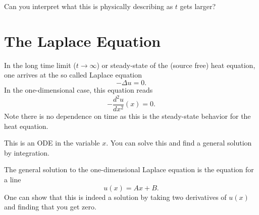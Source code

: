        \begin{exercise}
        Can you interpret what this is physically describing as $t$ gets larger?
        \end{exercise}
        
    
        \section{The Laplace Equation}
        In the long time limit ($t\to \infty$) or steady-state of the (source free) heat equation, one arrives at the so called Laplace equation
        \[
        -\Delta u = 0.
        \]
        In the one-dimensional case, this equation reads
        \[
        -\frac{d^2 u}{dx^2}(x) = 0.
        \]
        Note there is no dependence on time as this is the steady-state behavior for the heat equation.
        
        \begin{exercise}
        This is an ODE in the variable $x$.  You can solve this and find a general solution by integration.  
        \end{exercise} 
        
        \begin{answer}
        The general solution to the one-dimensional Laplace equation is the equation for a line
        \[
        u(x) = Ax+B.
        \]
        One can show that this is indeed a solution by taking two derivatives of $u(x)$ and finding that you get zero.
        \end{answer}
        
